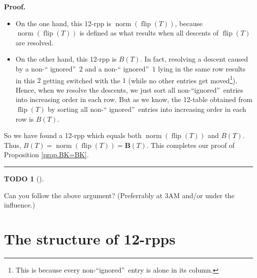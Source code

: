 \documentclass[numbers=enddot,12pt,final,onecolumn,notitlepage]{scrartcl}%
\theoremstyle{definition}
\newtheorem{quest}[theo]{TODO}
\newenvironment{todo}[1][]
{\begin{quest}[#1]\begin{leftbar}}
{\end{leftbar}\end{quest}}
\newenvironment{proof}[1][Proof]{\noindent\textbf{#1.} }{\ \rule{0.5em}{0.5em}}
\def\seplist{{\operatorname*{seplist}}} %
\def\ceq{{\operatorname*{ceq}}}
\def\ircont{{\operatorname*{ircont}}}
\def\ceqvar{{{\alpha}}} %
\def\seplistvar{{{\nu}}} %
\def\supp{{\operatorname*{supp}}}
\def\NS{{\operatorname*{NS}}}
\def\g{{\widetilde{g}}}
\def\t{{\mathbf{t}}}
\def\lm{{\lambda/\mu}}
\def\lmp{{(\lambda/\mu)}}
\def\N{{\mathbb{N}}}
\def\Z{\mathbb{Z}}
\begin{document}
\begin{proof}
\begin{itemize}
\item On the one hand, this 12-rpp is $\operatorname*{norm}\left(
\operatorname*{flip}\left(  T\right)  \right)  $, because
$\operatorname*{norm}\left(  \operatorname*{flip}\left(  T\right)  \right)  $
is defined as what results when all descents of $\operatorname*{flip}\left(
T\right)  $ are resolved.

\item On the other hand, this 12-rpp is $B\left(  T\right)  $. In fact,
resolving a descent caused by a non-\textquotedblleft
ignored\textquotedblright\ $2$ and a non-\textquotedblleft
ignored\textquotedblright\ $1$ lying in the same row results in this $2$
getting switched with the $1$ (while no other entries get moved\footnote{This
is because every non-\textquotedblleft ignored\textquotedblright\ entry is
alone in its column.}). Hence, when we resolve the descents, we just sort all
non-\textquotedblleft ignored\textquotedblright\ entries into increasing order
in each row. But as we know, the 12-table obtained from $\operatorname*{flip}%
\left(  T\right)  $ by sorting all non-\textquotedblleft
ignored\textquotedblright\ entries into increasing order in each row is
$B\left(  T\right)  $.
\end{itemize}

So we have found a 12-rpp which equals both $\operatorname*{norm}\left(
\operatorname*{flip}\left(  T\right)  \right)  $ and $B\left(  T\right)  $.
Thus, $B\left(  T\right)  =\operatorname*{norm}\left(  \operatorname*{flip}%
\left(  T\right)  \right)  =\mathbf{B}\left(  T\right)  $. This completes our
proof of Proposition \ref{prop.BK=BK}.
\end{proof}

\begin{todo}
Can you follow the above argument? (Preferrably at 3AM and/or under the influence.)
\end{todo}



\section{The structure of 12-rpps}
\label{sect.structure}
\def\seplist{{\operatorname*{seplist}}} %
\def\ceq{{\operatorname*{ceq}}}
\def\ircont{{\operatorname*{ircont}}}
\def\ceqvar{{{\alpha}}} %
\def\seplistvar{{{\nu}}} %
\def\supp{{\operatorname*{supp}}}
\def\NS{{\operatorname*{NS}}}
\def\g{{\widetilde{g}}}
\def\t{{\mathbf{t}}}
\def\lm{{\lambda/\mu}}
\def\lmp{{(\lambda/\mu)}}
\def\N{{\mathbb{N}}}
\def\Z{\mathbb{Z}}
\def\xx{{\mathbf{x}}}
\end{document}

